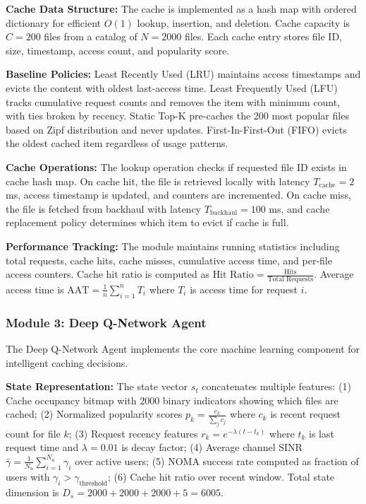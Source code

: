 \documentclass[12pt,a4paper]{article}
\begin{document}
\textbf{Cache Data Structure:} The cache is implemented as a hash map with ordered dictionary for efficient $O(1)$ lookup, insertion, and deletion. Cache capacity is $C = 200$ files from a catalog of $N = 2000$ files. Each cache entry stores file ID, size, timestamp, access count, and popularity score.

\textbf{Baseline Policies:} Least Recently Used (LRU) maintains access timestamps and evicts the content with oldest last-access time. Least Frequently Used (LFU) tracks cumulative request counts and removes the item with minimum count, with ties broken by recency. Static Top-K pre-caches the 200 most popular files based on Zipf distribution and never updates. First-In-First-Out (FIFO) evicts the oldest cached item regardless of usage patterns.

\textbf{Cache Operations:} The lookup operation checks if requested file ID exists in cache hash map. On cache hit, the file is retrieved locally with latency $T_{\text{cache}} = 2$ ms, access timestamp is updated, and counters are incremented. On cache miss, the file is fetched from backhaul with latency $T_{\text{backhaul}} = 100$ ms, and cache replacement policy determines which item to evict if cache is full.

\textbf{Performance Tracking:} The module maintains running statistics including total requests, cache hits, cache misses, cumulative access time, and per-file access counters. Cache hit ratio is computed as $\text{Hit Ratio} = \frac{\text{Hits}}{\text{Total Requests}}$. Average access time is $\text{AAT} = \frac{1}{n}\sum_{i=1}^n T_i$ where $T_i$ is access time for request $i$.

\subsubsection{Module 3: Deep Q-Network Agent}

The Deep Q-Network Agent implements the core machine learning component for intelligent caching decisions.

\textbf{State Representation:} The state vector $s_t$ concatenates multiple features: (1) Cache occupancy bitmap with 2000 binary indicators showing which files are cached; (2) Normalized popularity scores $p_k = \frac{c_k}{\sum_j c_j}$ where $c_k$ is recent request count for file $k$; (3) Request recency features $r_k = e^{-\lambda(t - t_k)}$ where $t_k$ is last request time and $\lambda = 0.01$ is decay factor; (4) Average channel SINR $\bar{\gamma} = \frac{1}{N_u}\sum_{i=1}^{N_u} \gamma_i$ over active users; (5) NOMA success rate computed as fraction of users with $\gamma_i > \gamma_{\text{threshold}}$; (6) Cache hit ratio over recent window. Total state dimension is $D_s = 2000 + 2000 + 2000 + 5 = 6005$.
\end{document}
